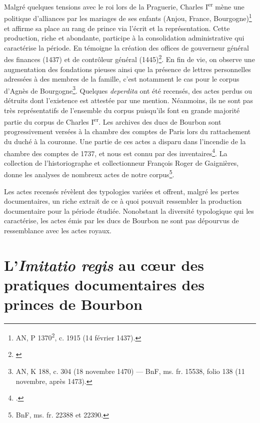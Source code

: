 \par Malgré quelques tensions avec le roi lors de la Praguerie, Charles I\textsuperscript{er} mène une politique d’alliances par les mariages de ses enfants (Anjou, France, Bourgogne)\footnote{AN, P 1370\textsuperscript{2}, c. 1915 (14 février 1437).} et affirme sa place au rang de prince via l’écrit et la représentation. Cette production, riche et abondante, participe à la consolidation administrative qui caractérise la période. En témoigne la création des offices de gouverneur général des finances (1437) et de contrôleur général (1445)\footnote{\cite{matteoniServirPrinceOfficiers1994}}. En fin de vie, on observe une augmentation des fondations pieuses ainsi que la présence de lettres personnelles adressées à des membres de la famille, c'est notamment le cas pour le corpus d'Agnès de Bourgogne\footnote{AN, K 188, c. 304 (18 novembre 1470) — BnF, ms. fr. 15538, folio 138 (11 novembre, après 1473).}. Quelques \textit{deperdita} ont été recensés, des actes perdus ou détruits dont l'existence est attestée par une mention. Néanmoins, ils ne sont pas très représentatifs de l'ensemble du corpus puisqu'ils font en grande majorité partie du corpus de Charles I\textsuperscript{er}. Les archives des ducs de Bourbon sont progressivement versées à la chambre des comptes de Paris lors du rattachement du duché à la couronne. Une partie de ces actes a disparu dans l'incendie de la chambre des comptes de 1737, et nous est connu par des inventaires\footnote{\cite{nortierSortArchivesDispersees1965}.}. La collection de l'historiographe et collectionneur François Roger de Gaignières, donne les analyses de nombreux actes de notre corpus\footnote{BnF, ms. fr. 22388 et 22390.}. 
\newline 

\par Les actes recensés révèlent des typologies variées et offrent, malgré les pertes documentaires, un riche extrait de ce à quoi pouvait ressembler la production documentaire pour la période étudiée. Nonobstant la diversité typologique qui les caractérise, les actes émis par les ducs de Bourbon ne sont pas dépourvus de ressemblance avec les actes royaux.
\newpage 

\section[Pratiques d'\textit{imitatio regis}]{L'\textit{Imitatio regis} au c\oe{}ur des pratiques documentaires des princes de Bourbon}
\label{I.1.4}

